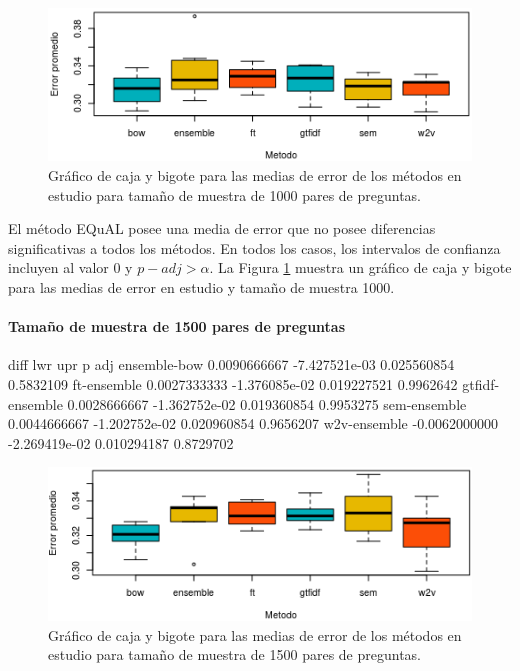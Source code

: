 \begin{figure}
	\centering
	\includegraphics[width=0.7\linewidth]{10_resultados/imagenes/anova_1000}
	\caption{Gráfico de caja y bigote para las medias de error de los métodos en estudio para tamaño de muestra de 1000 pares de preguntas.}
	\label{fig:anova1000}
\end{figure}

\bigskip El método EQuAL posee una media de error que no posee diferencias significativas a todos los métodos. En todos los casos, los intervalos de confianza incluyen al valor 0 y \(p-adj > \alpha\). La Figura \ref{fig:anova1000} muestra un gráfico de caja y bigote para las medias de error en estudio y tamaño de muestra 1000.

\bigskip
\paragraph{Tamaño de muestra de 1500 pares de preguntas}
\begin{rc}
                        diff           lwr         upr     p adj
ensemble-bow     0.0090666667 -7.427521e-03 0.025560854 0.5832109
ft-ensemble      0.0027333333 -1.376085e-02 0.019227521 0.9962642
gtfidf-ensemble  0.0028666667 -1.362752e-02 0.019360854 0.9953275
sem-ensemble     0.0044666667 -1.202752e-02 0.020960854 0.9656207
w2v-ensemble    -0.0062000000 -2.269419e-02 0.010294187 0.8729702
\end{rc}

\begin{figure}
	\centering
	\includegraphics[width=0.7\linewidth]{10_resultados/imagenes/anova_1500}
	\caption{Gráfico de caja y bigote para las medias de error de los métodos en estudio para tamaño de muestra de 1500 pares de preguntas.}
	\label{fig:anova1500}
\end{figure}

